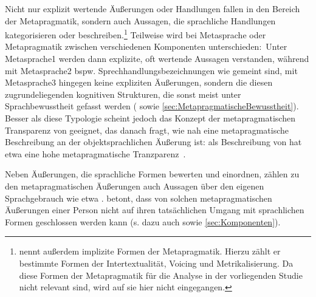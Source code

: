 Nicht nur explizit wertende Äußerungen oder Handlungen fallen in den Bereich der Metapragmatik, sondern auch Aussagen, die sprachliche Handlungen kategorisieren oder beschreiben.\footnote{\citet[]{Silverstein.2018} nennt außerdem implizite Formen der Metapragmatik. Hierzu zählt er bestimmte Formen der Intertextualität, Voicing und Metrikalisierung. Da diese Formen der Metapragmatik für die Analyse in der vorliegenden Studie nicht relevant sind, wird auf sie hier nicht eingegangen.}
Teilweise wird bei Metasprache oder Metapragmatik zwischen verschiedenen Komponenten unterschieden:~Unter Metasprache1 werden dann explizite, oft wertende Aussagen verstanden, während mit Metasprache2 bspw. Sprechhandlungsbezeichnungen wie  gemeint sind, mit Metasprache3 hingegen keine expliziten {\"A}u{\ss}erungen, sondern die diesen zugrundeliegenden kognitiven Strukturen, die sonst meist unter Sprachbewusstheit gefasst werden (\citealp[s.][16--19]{Cuonz.2014} sowie \autoref{sec:MetapragmatischeBewusstheit}). 
Besser als diese Typologie scheint jedoch das Konzept der metapragmatischen Transparenz von \citet[16--17]{Silverstein.1981} geeignet, das danach fragt, wie nah eine metapragmatische Beschreibung an der objektsprachlichen {\"A}u{\ss}erung ist:  als Beschreibung von  hat etwa eine hohe metapragmatische Tranzparenz~\citep[s.][16--17]{Silverstein.1981}.

Neben Äußerungen, die sprachliche Formen bewerten und einordnen, zählen zu den metapragmatischen Äußerungen auch Aussagen über den eigenen Sprachgebrauch wie etwa . 
\citet[50]{Cavanaugh.2013} betont, dass von solchen metapragmatischen {\"A}u{\ss}erungen einer Person nicht auf ihren tats{\"a}chlichen Umgang mit sprachlichen Formen geschlossen werden kann (s. dazu auch \citealp[43]{Silverstein.1976} sowie \autoref{sec:Komponenten}). 

